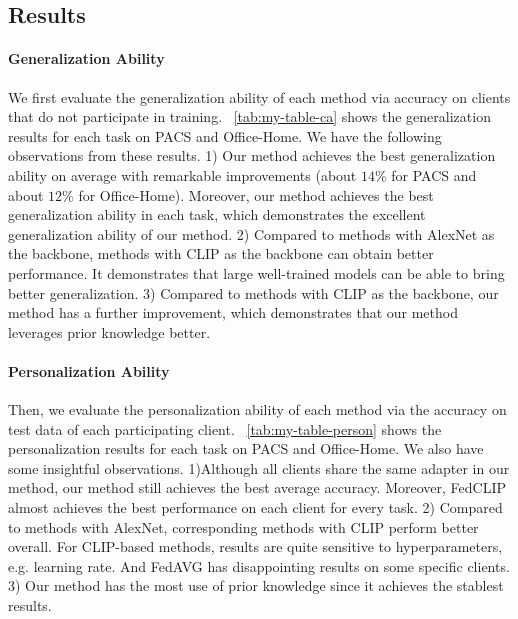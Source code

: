 \documentclass[11pt]{article}
\newcommand{\method}{FedCLIP\xspace}
\newcommand{\wjdd}[1]{\todo[linecolor=cyan,backgroundcolor=cyan!25,bordercolor=cyan,size=\scriptsize]{(WJD): #1}}
\begin{document}
\subsection{Results}
\paragraph{Generalization Ability}

We first evaluate the generalization ability of each method via accuracy on clients that do not participate in training.
\tablename~\ref{tab:my-table-ca} shows the generalization results for each task on PACS and Office-Home.
We have the following observations from these results.
1) Our method achieves the best generalization ability on average with remarkable improvements (about $14\%$ for PACS and about $12\%$ for Office-Home).
Moreover, our method achieves the best generalization ability in each task, which demonstrates the excellent generalization ability of our method.
2) Compared to methods with AlexNet as the backbone, methods with CLIP as the backbone can obtain better performance.
It demonstrates that large well-trained models can be able to bring better generalization.
3) Compared to methods with CLIP as the backbone, our method has a further improvement, which demonstrates that our method leverages prior knowledge better.%

\paragraph{Personalization Ability}

Then, we evaluate the personalization ability of each method via the accuracy on test data of each participating client.
\tablename~\ref{tab:my-table-person} shows the personalization results for each task on PACS and Office-Home.
We also have some insightful observations.
1)Although all clients share the same adapter in our method, our method still achieves the best average accuracy.
Moreover, \method almost achieves the best performance on each client for every task.
2) Compared to methods with AlexNet, corresponding methods with CLIP perform better overall.
For CLIP-based methods, results are quite sensitive to hyperparameters, e.g. learning rate.
And FedAVG has disappointing results on some specific clients.
3) Our method has the most use of prior knowledge since it achieves the stablest results.
\end{document}
